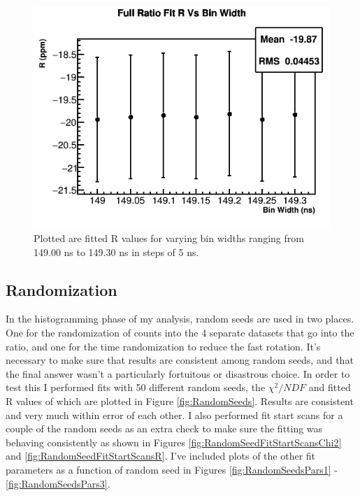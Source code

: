 		\begin{figure}[]
			\centering
			\includegraphics[width=.6\textwidth]{BinWidthComparison_R}
		    \caption[BinWidth]{Plotted are fitted R values for varying bin widths ranging from 149.00 ns to 149.30 ns in steps of 5 ns.}
		    \label{fig:BinWidth}
		\end{figure}

	\subsection{Randomization}
	\label{Sec:Randomization}

		In the histogramming phase of my analysis, random seeds are used in two places. One for the randomization of counts into the 4 separate datasets that go into the ratio, and one for the time randomization to reduce the fast rotation. It's necessary to make sure that results are consistent among random seeds, and that the final answer wasn't a particularly fortuitous or disastrous choice. In order to test this I performed fits with 50 different random seeds, the $\chi^{2}/NDF$ and fitted R values of which are plotted in Figure \ref{fig:RandomSeeds}. Results are consistent and very much within error of each other. I also performed fit start scans for a couple of the random seeds as an extra check to make sure the fitting was behaving consistently as shown in Figures \ref{fig:RandomSeedFitStartScansChi2} and \ref{fig:RandomSeedFitStartScansR}. I've included plots of the other fit parameters as a function of random seed in Figures \ref{fig:RandomSeedsPars1} - \ref{fig:RandomSeedsPars3}.

